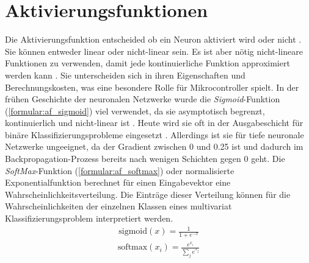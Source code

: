 \section{Aktivierungsfunktionen}
Die Aktivierungsfunktion entscheided ob ein Neuron aktiviert wird oder nicht \cite{nwankpa2018activation}.
Sie können entweder linear oder nicht-linear sein.
Es ist aber nötig nicht-lineare Funktionen zu verwenden, damit jede kontinuierliche Funktion approximiert werden kann \cite{apicella2021survey}.
Sie unterscheiden sich in ihren Eigenschaften und Berechnungskosten, was eine besondere Rolle für Mikrocontroller spielt.
\newline
\newline
In der frühen Geschichte der neuronalen Netzwerke wurde die \textit{Sigmoid}-Funktion (\ref{formular:af_sigmoid}) viel verwendet, da sie asymptotisch begrenzt,
kontinuierlich und nicht-linear ist \cite{apicella2021survey}.
Heute wird sie oft in der Ausgabeschicht für binäre Klassifizierungsprobleme eingesetzt \cite{nwankpa2018activation}.
Allerdings ist sie für tiefe neuronale Netzwerke ungeeignet, da der Gradient zwischen 0 und 0.25 ist und dadurch im
Backpropagation-Prozess bereits nach wenigen Schichten gegen 0 geht.
Die \textit{SoftMax}-Funktion (\ref{formular:af_softmax}) oder normalisierte Exponentialfunktion berechnet für einen Eingabevektor eine Wahrscheinlichkeitsverteilung.
Die Einträge dieser Verteilung können für die Wahrscheinlichkeiten der einzelnen Klassen eines multivariat Klassifizierungsproblem interpretiert werden.
\begin{align}
    \label{formular:af_sigmoid}
    \text{sigmoid}(x) = \frac{1}{1 + e^{-x}}
\end{align}
\begin{align}
    \label{formular:af_softmax}
    \text{softmax}(x_i) = \frac{e^{x_i}}{\sum_j e^{x_j}}
\end{align}
